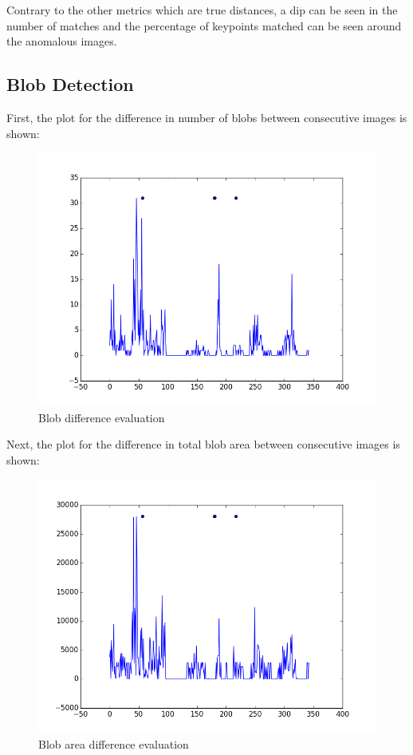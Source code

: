 Contrary to the other metrics which are true distances, a dip can be seen in the number of matches and the percentage of keypoints matched can be seen around the anomalous images.

\subsection{Blob Detection}

First, the plot for the difference in number of blobs between consecutive images is shown:

\begin{figure}[h]
\centering
\includegraphics[scale=.50]{figures/blobdiffstest}
\caption{Blob difference evaluation}
\label{fig:tamu-fig3}
\end{figure}

Next, the plot for the difference in total blob area between consecutive images is shown:

\begin{figure}[h]
\centering
\includegraphics[scale=.50]{figures/blobareadiffstest}
\caption{Blob area difference evaluation}
\label{fig:tamu-fig3}
\end{figure}

